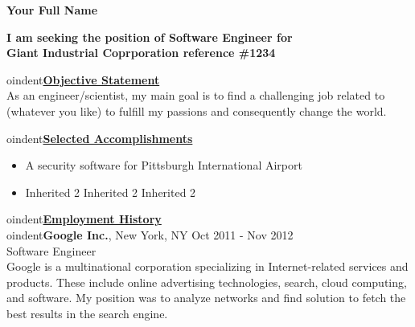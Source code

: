 \documentclass[11pt]{article}
\begin{document}
\centerline{\bf{Your Full Name}}

\begin{center}
\bf I am seeking the position of Software Engineer for \\ \vspace{-1mm} Giant Industrial Coprporation reference \#1234
\end{center}


oindent{\bf \underline{Objective Statement}} \\ %
As an engineer/scientist, my main goal is to find a challenging job related to (whatever you like) to fulfill my passions and consequently change the world.

\vspace{2mm}

oindent{\bf  \underline{Selected Accomplishments}} \\ \vspace{-3.5mm}
\begin{itemize}
\item A security software for Pittsburgh International Airport   \\ \vspace{-1mm}
\item Inherited 2 Inherited 2 Inherited 2   \\ \vspace{-1mm}
\end{itemize}



oindent{\bf  \underline{Employment History}} \\ %



oindent{\bf Google Inc.}, New York, NY  \hfill Oct 2011 - Nov 2012 \\ \vspace{-1mm}
\hspace{4mm} Software Engineer \\
Google is a multinational corporation specializing in Internet-related services and products. These include online advertising technologies, search, cloud computing, and software. My position was to analyze  networks and find solution to fetch the best results in the search engine.
\end{document}
